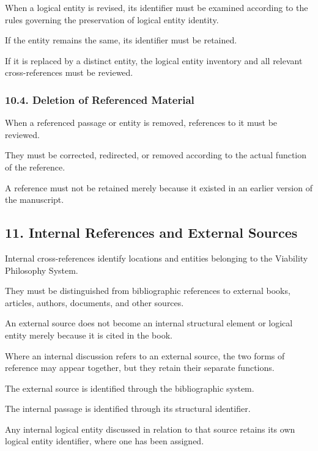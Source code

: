 When a logical entity is revised,
its identifier must be examined
according to the rules governing
the preservation of logical
entity identity.

If the entity remains the same,
its identifier must be retained.

If it is replaced by a distinct
entity, the logical entity
inventory and all relevant
cross-references must be reviewed.

\subsubsection*{10.4. Deletion of Referenced Material}

When a referenced passage or
entity is removed, references
to it must be reviewed.

They must be corrected, redirected,
or removed according to the
actual function of the reference.

A reference must not be retained
merely because it existed in
an earlier version of the manuscript.


\subsection*{11. Internal References and External Sources}

Internal cross-references identify
locations and entities belonging
to the Viability Philosophy System.

They must be distinguished from
bibliographic references to external
books, articles, authors, documents,
and other sources.

An external source does not become
an internal structural element
or logical entity merely because
it is cited in the book.

Where an internal discussion refers
to an external source, the two
forms of reference may appear
together, but they retain their
separate functions.

The external source is identified
through the bibliographic system.

The internal passage is identified
through its structural identifier.

Any internal logical entity
discussed in relation to that
source retains its own logical
entity identifier, where one
has been assigned.


